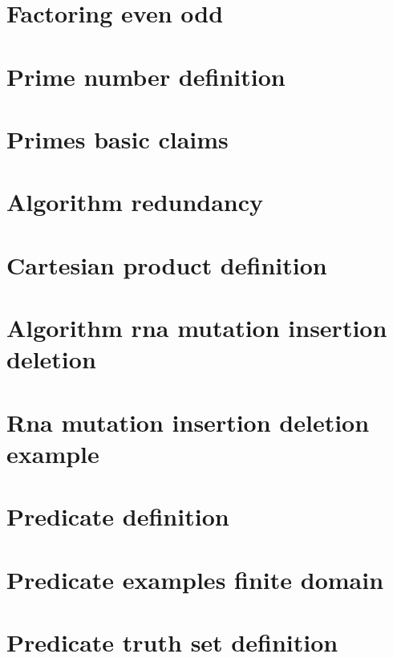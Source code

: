 \section*{Factoring even odd}

\vfill
\section*{Prime number definition}

\vfill
\section*{Primes basic claims}

\vfill
\section*{Algorithm redundancy}

\vfill
\section*{Cartesian product definition}

\vfill
\section*{Algorithm rna mutation insertion deletion}

\vfill
\section*{Rna mutation insertion deletion example}

\vfill
\section*{Predicate definition}

\vfill
\section*{Predicate examples finite domain}

\vfill
\section*{Predicate truth set definition}

\vfill
